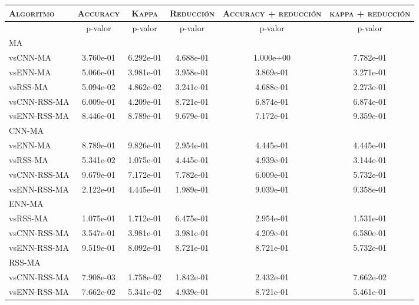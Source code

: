 \begin{table}[h!]
\centering
\begin{adjustbox}{max width =\textwidth}
\begin{tabular}{l c c c c c}
\hline
	\textsc{Algoritmo}
	& \multicolumn{1}{c}{\textsc{Accuracy}}
	& \multicolumn{1}{c}{\textsc{Kappa}}
	& \multicolumn{1}{c}{\textsc{Reducción}} 
	& \multicolumn{1}{c}{\textsc{Accuracy + reducción}} 
	& \multicolumn{1}{c}{\textsc{kappa + reducción}} \\

\hline
\hline

 & p-valor & p-valor & p-valor & p-valor & p-valor \\

MA\\
vsCNN-MA     & 3.760e-01 & 6.292e-01 & 4.688e-01 & 1.000e+00 & 7.782e-01 \\ 
vsENN-MA     & 5.066e-01 & 3.981e-01 & 3.958e-01 & 3.869e-01 & 3.271e-01 \\ 
vsRSS-MA     & 5.094e-02 & 4.862e-02 & 3.241e-01 & 4.688e-01 & 2.273e-01 \\ 
vsCNN-RSS-MA & 6.009e-01 & 4.209e-01 & 8.721e-01 & 6.874e-01 & 6.874e-01 \\ 
vsENN-RSS-MA & 8.446e-01 & 8.789e-01 & 9.679e-01 & 7.172e-01 & 9.359e-01 \\ 
 
\hline

CNN-MA\\
vsENN-MA & 8.789e-01 & 9.826e-01 & 2.954e-01 & 4.445e-01 & 4.445e-01 \\  
vsRSS-MA & 5.341e-02 & 1.075e-01 & 4.445e-01 & 4.939e-01 & 3.144e-01 \\ 
vsCNN-RSS-MA  & 9.679e-01 & 7.172e-01 & 7.782e-01 & 6.009e-01 & 5.732e-01 \\
vsENN-RSS-MA & 2.122e-01 & 4.445e-01 & 1.989e-01 & 9.039e-01 & 9.358e-01 \\

\hline

ENN-MA\\
vsRSS-MA  & 1.075e-01 & 1.712e-01 & 6.475e-01 & 2.954e-01 & 1.531e-01 \\ 
vsCNN-RSS-MA  & 3.547e-01 & 3.981e-01 & 3.981e-01 & 4.209e-01 & 6.580e-01 \\
vsENN-RSS-MA & 9.519e-01 & 8.092e-01 & 8.721e-01 & 8.721e-01 & 5.732e-01 \\ 

\hline

RSS-MA\\
vsCNN-RSS-MA & 7.908e-03 & 1.758e-02 & 1.842e-01 & 2.432e-01 & 7.662e-02 \\
vsENN-RSS-MA  & 7.662e-02 & 5.341e-02 & 4.939e-01 & 8.721e-01 & 5.461e-01 \\ 


\end{tabular}
\end{adjustbox}
\end{table}
